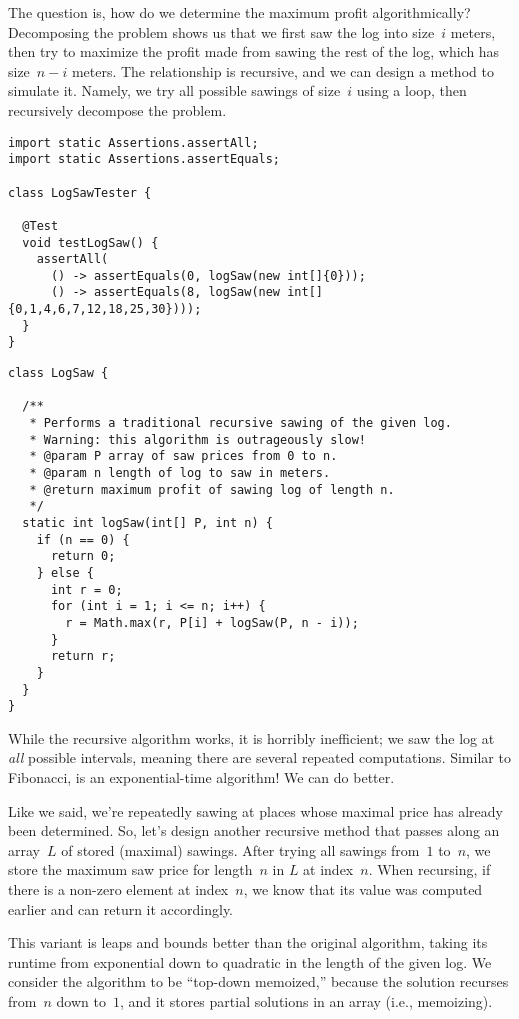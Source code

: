 The question is, how do we determine the maximum profit algorithmically? 
Decomposing the problem shows us that we first saw the log into size~$i$ meters, then try to maximize the profit made from sawing the rest of the log, which has size~$n - i$ meters. 
The relationship is recursive, and we can design a method to simulate it.
Namely, we try all possible sawings of size~$i$ using a loop, then recursively decompose the problem.

\begin{lstlisting}[language=MyJava]
import static Assertions.assertAll;
import static Assertions.assertEquals;

class LogSawTester {

  @Test
  void testLogSaw() {
    assertAll(
      () -> assertEquals(0, logSaw(new int[]{0}));
      () -> assertEquals(8, logSaw(new int[]{0,1,4,6,7,12,18,25,30})));
  }
}
\end{lstlisting}

\begin{lstlisting}[language=MyJava]
class LogSaw {
  
  /**
   * Performs a traditional recursive sawing of the given log.
   * Warning: this algorithm is outrageously slow!
   * @param P array of saw prices from 0 to n.
   * @param n length of log to saw in meters.
   * @return maximum profit of sawing log of length n.
   */
  static int logSaw(int[] P, int n) {
    if (n == 0) {
      return 0;
    } else {
      int r = 0;
      for (int i = 1; i <= n; i++) {
        r = Math.max(r, P[i] + logSaw(P, n - i));
      }
      return r;
    }
  }
}
\end{lstlisting}

While the recursive algorithm works, it is horribly inefficient; we saw the log at \emph{all} possible intervals, meaning there are several repeated computations. 
Similar to Fibonacci,  is an exponential-time algorithm! 
We can do better.

Like we said, we're repeatedly sawing at places whose maximal price has already been determined.
So, let's design another recursive method that passes along an array~$L$ of stored (maximal) sawings.
After trying all sawings from~$1$ to~$n$, we store the maximum saw price for length~$n$ in $L$ at index~$n$.
When recursing, if there is a non-zero element at index~$n$, we know that its value was computed earlier and can return it accordingly.

This variant is leaps and bounds better than the original algorithm, taking its runtime from exponential down to quadratic in the length of the given log. 
We consider the algorithm to be ``top-down memoized,'' because the solution recurses from~$n$ down to~$1$, and it stores partial solutions in an array (i.e., memoizing). 

